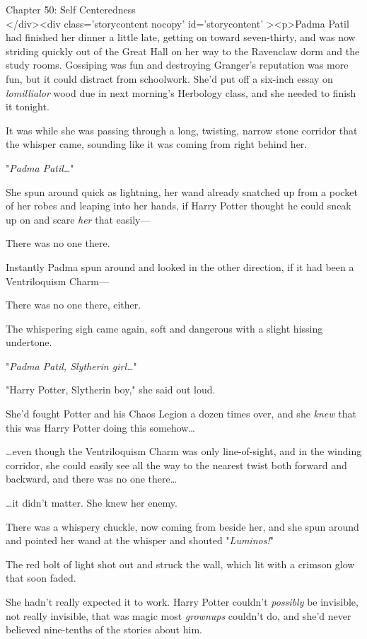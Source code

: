 
Chapter 50: Self Centeredness\\
</div><div  class='storycontent nocopy' id='storycontent' ><p>Padma Patil had 
finished her dinner a little late, getting on toward seven-thirty, and was now 
striding quickly out of the Great Hall on her way to the Ravenclaw dorm and the 
study rooms. Gossiping was fun and destroying Granger's reputation was more 
fun, but it could distract from schoolwork. She'd put off a six-inch essay on 
\emph{lomillialor} wood due in next morning's Herbology class, and she needed 
to finish it tonight.

It was while she was passing through a long, twisting, narrow stone corridor 
that the whisper came, sounding like it was coming from right behind her.

"\emph{Padma Patil{\ldots}}"

She spun around quick as lightning, her wand already snatched up from a pocket 
of her robes and leaping into her hands, if Harry Potter thought he could sneak 
up on and scare \emph{her} that easily---

There was no one there.

Instantly Padma spun around and looked in the other direction, if it had been a 
Ventriloquism Charm---

There was no one there, either.

The whispering sigh came again, soft and dangerous with a slight hissing 
undertone.

"\emph{Padma Patil, Slytherin girl{\ldots}}"

"Harry Potter, Slytherin boy," she said out loud.

She'd fought Potter and his Chaos Legion a dozen times over, and she 
\emph{knew} that this was Harry Potter doing this somehow{\ldots}

{\ldots}even though the Ventriloquism Charm was only line-of-sight, and in the 
winding corridor, she could easily see all the way to the nearest twist both 
forward and backward, and there was no one there{\ldots}

{\ldots}it didn't matter. She knew her enemy.

There was a whispery chuckle, now coming from beside her, and she spun around 
and pointed her wand at the whisper and shouted "\emph{Luminos!}"

The red bolt of light shot out and struck the wall, which lit with a crimson 
glow that soon faded.

She hadn't really expected it to work. Harry Potter couldn't \emph{possibly} be 
invisible, not really invisible, that was magic most \emph{grownups} couldn't 
do, and she'd never believed nine-tenths of the stories about him.

